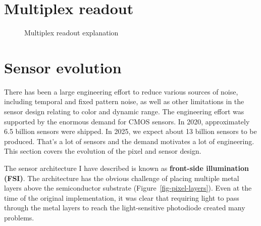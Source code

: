 \documentclass[
  letterpaper,
]{book}
\begin{document}
\section{Multiplex readout}\label{multiplex-readout}

\begin{figure}


\caption{\label{fig-cmos-multiplex}Multiplex readout explanation}

\end{figure}%

\section{Sensor evolution}\label{sec-sensor-evolution}

There has been a large engineering effort to reduce various sources of
noise, including temporal and fixed pattern noise, as well as other
limitations in the sensor design relating to color and dynamic range.
The engineering effort was supported by the enormous demand for CMOS
sensors. In 2020, approximately 6.5 billion sensors were shipped. In
2025, we expect about 13 billion sensors to be produced. That's a lot of
sensors and the demand motivates a lot of engineering. This section
covers the evolution of the pixel and sensor design.

The sensor architecture I have described is known as \textbf{front-side
illumination (FSI)}. The architecture has the obvious challenge of
placing multiple metal layers above the semiconductor substrate
(Figure~\ref{fig-pixel-layers}). Even at the time of the original
implementation, it was clear that requiring light to pass through the
metal layers to reach the light-sensitive photodiode created many
problems.
\end{document}
